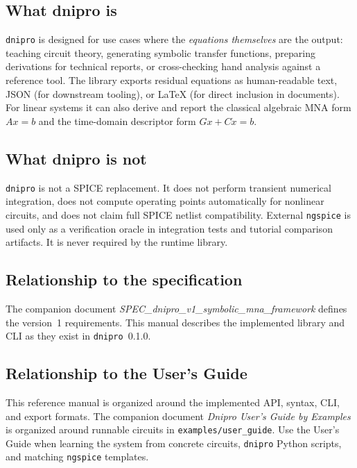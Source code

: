 \documentclass[11pt,a4paper]{article}
\newcommand{\project}{\texttt{dnipro}}
\newcommand{\code}[1]{\texttt{#1}}
\newcommand{\ngspice}{\texttt{ngspice}}
\begin{document}
\subsection{What dnipro is}

\project{} is designed for use cases where the \emph{equations themselves} are the output:
teaching circuit theory, generating symbolic transfer functions, preparing
derivations for technical reports, or cross-checking hand analysis against a reference tool.
The library exports residual equations as human-readable text, JSON (for downstream
tooling), or LaTeX (for direct inclusion in documents). For linear systems it can
also derive and report the classical algebraic MNA form \(A x = b\) and the
time-domain descriptor form \(Gx + C\dot{x} = b\).

\subsection{What dnipro is not}

\project{} is not a SPICE replacement.
It does not perform transient numerical integration, does not compute operating
points automatically for nonlinear circuits, and does not claim full SPICE netlist
compatibility.
External \ngspice{} is used only as a verification oracle in integration tests
and tutorial comparison artifacts. It is never required by the runtime library.

\subsection{Relationship to the specification}

The companion document \emph{SPEC\_dnipro\_v1\_symbolic\_mna\_framework} defines the
version~1 requirements.
This manual describes the implemented library and CLI as they exist in \project{}~0.1.0.

\subsection{Relationship to the User's Guide}

This reference manual is organized around the implemented API, syntax, CLI, and
export formats. The companion document \emph{Dnipro User's Guide by Examples}
is organized around runnable circuits in \code{examples/user\_guide}. Use the
User's Guide when learning the system from concrete circuits, \project{} Python
scripts, and matching \ngspice{} templates.
\end{document}
